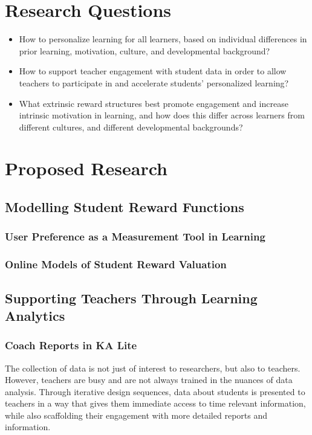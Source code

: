 \documentclass[12pt,a4paper,titlepage]{scrreprt}
\begin{document}
\chapter{Research Questions}
\begin{itemize}
\item How to personalize learning for all learners, based on individual differences in prior learning, motivation, culture, and developmental background?
\item How to support teacher engagement with student data in order to allow teachers to participate in and accelerate students' personalized learning?
\item What extrinsic reward structures best promote engagement and increase intrinsic motivation in learning, and how does this differ across learners from different cultures, and different developmental backgrounds?
\end{itemize}
\chapter{Proposed Research}
\section{Modelling Student Reward Functions}
\subsection{User Preference as a Measurement Tool in Learning}


\subsection{Online Models of Student Reward Valuation}


\section{Supporting Teachers Through Learning Analytics}
\subsection{Coach Reports in KA Lite}

The collection of data is not just of interest to researchers, but also to teachers. However, teachers are busy and are not always trained in the nuances of data analysis. Through iterative design sequences, data about students is presented to teachers in a way that gives them immediate access to time relevant information, while also scaffolding their engagement with more detailed reports and information.
\end{document}
